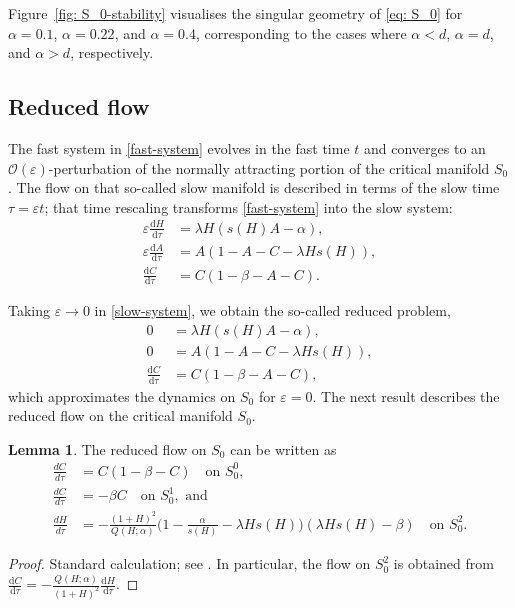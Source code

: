 \documentclass{article}
\theoremstyle{definition}
\numberwithin{equation}{section}
\newtheorem{lem}[prop]{Lemma}
\newcommand{\dd}{\mathrm{d}}
\begin{document}
Figure~\ref{fig: S_0-stability} visualises the singular geometry of \eqref{eq: S_0} for $\alpha=0.1$, $\alpha=0.22$, and $\alpha=0.4$, corresponding to the cases where $\alpha<d$, $\alpha=d$, and $\alpha>d$, respectively.

\subsection{Reduced flow}

The fast system in \eqref{fast-system} evolves in the fast time $t$ and converges to an $\mathcal{O}(\varepsilon)$-perturbation of the normally attracting portion of the critical manifold $S_0$. The flow on that so-called slow manifold is described in terms of the slow time $\tau=\varepsilon t$; that time rescaling transforms \eqref{fast-system} into the slow system:
\begin{equation}
    \begin{aligned}
        \varepsilon\frac{\dd H}{\dd \tau} &=  \lambda H(s(H) A - \alpha), \\
    \varepsilon\frac{\dd A}{\dd \tau} &= A(1-A-C-\lambda H s(H)), \\
    \frac{\dd C}{\dd \tau} &= C(1-\beta-A-C).
    \label{slow-system}
    \end{aligned}
\end{equation}

Taking $\varepsilon\to 0$ in \eqref{slow-system}, we obtain the so-called reduced problem, 
\begin{equation}
    \begin{aligned}
        0&=  \lambda H(s(H)A - \alpha), \\
    0&= A(1-A-C-\lambda H s(H)), \\
    \frac{\dd C}{\dd \tau} &= C(1-\beta-A-C),
    \label{reduced-system}
    \end{aligned}
\end{equation}
which approximates the dynamics on $S_0$ for $\varepsilon=0$. The next result describes the reduced flow on the critical manifold $S_0$.
\begin{lem}
The reduced flow on $S_0$ can be written as  
    \begin{equation}
        \begin{aligned}
            \frac{d C}{d\tau}& = C(1-\beta-C) \quad\text{on } S_0^0, \\
            \frac{d C}{d\tau}& = -\beta C \quad \text{on } S_0^1, \text{ and} \\
            \frac{d H}{d\tau}& = -\frac{(1+H)^2}{Q(H;\alpha)} \bigg(1-\frac{\alpha}{s(H)}-\lambda H s(H)\bigg)(\lambda H s(H)-\beta) \quad \text{on } S_0^2. \label{reduced flow}
        \end{aligned}
    \end{equation}
\end{lem}
\begin{proof}
    Standard calculation; see \cite[Chapter $3$]{MTSD}. In particular, the flow on $S_0^2$ is obtained from $\frac{\dd C}{\dd \tau}=-\frac{Q(H;\alpha)}{(1+H)^2}\frac{\dd H}{\dd \tau}$.
\end{proof}
\end{document}
